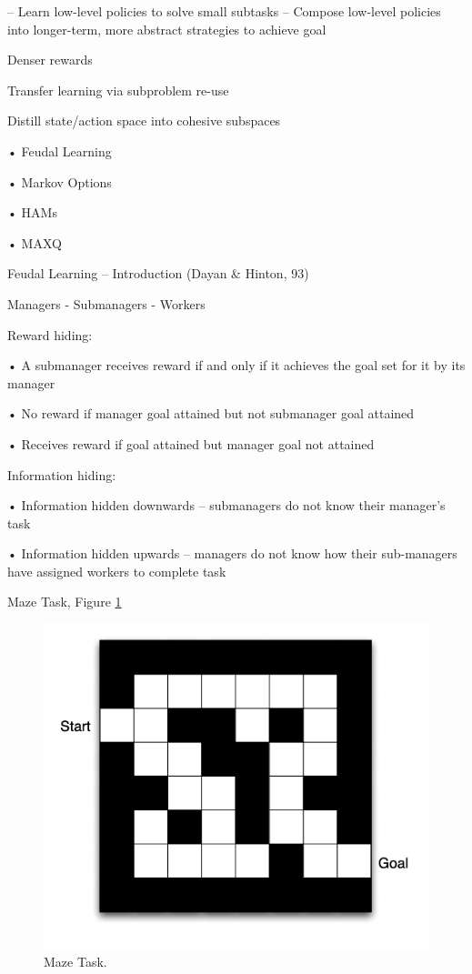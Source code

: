 \documentclass[english]{article}
\begin{document}
– Learn low-level policies to solve small subtasks
– Compose low-level policies into longer-term, more abstract
strategies to achieve goal
\benum 
\item  Denser rewards
\item  Transfer learning via subproblem re-use
\item  Distill state/action space into cohesive subspaces

\eenum

\item  
• Feudal Learning

• Markov Options

• HAMs

• MAXQ

\item Feudal Learning – Introduction   (Dayan \& Hinton, 93)

Managers - Submanagers - Workers

\benum 
\item  
Reward hiding: 

•  A submanager receives reward
if and only if it achieves the
goal set for it by its manager

• No reward if manager goal
attained but not submanager
goal attained

• Receives reward if goal
attained but manager goal not
attained

\item  
Information hiding: 

• Information hidden
downwards – submanagers do
not know their manager's task

• Information hidden upwards –
managers do not know how
their sub-managers have
assigned workers to complete
task

\item  Maze Task, Figure \ref{maze10}

  \begin{figure}
        \centering
        \includegraphics[scale = 0.35]{maze.PNG}
        
        \caption{Maze Task.}
        \label{maze10}
    \end{figure}
\end{document}
